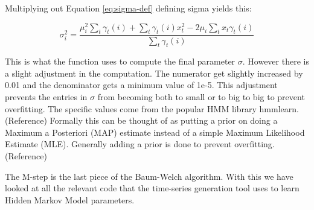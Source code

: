Multiplying out Equation \eqref{eq:sigma-def} defining sigma yields this: 

\begin{equation}
   \sigma_i^2 = \frac{\mu_i^2 \sum_t \gamma_t(i) + \sum_t \gamma_t(i)x_t^2 - 2 \mu_i \sum_t x_t \gamma_t(i)}{\sum_t \gamma_t(i)}
\end{equation}

This is what the function uses to compute the final parameter $\sigma$. However there is a slight adjustment in the computation. The numerator get slightly increased by 0.01 and the denominator gets a minimum value of 1e-5. This adjustment prevents the entries in $\sigma$ from becoming both to small or to big to big to prevent overfitting. The specific values come from the popular HMM library hmmlearn. (Reference) Formally this can be thought of as putting a prior on doing a Maximum a Posteriori (MAP) estimate instead of a simple Maximum Likelihood Estimate (MLE). Generally adding a prior is done to prevent overfitting.  (Reference)

The M-step is the last piece of the Baum-Welch algorithm. With this we have looked at all the relevant code that the time-series generation tool uses to learn Hidden Markov Model parameters. 